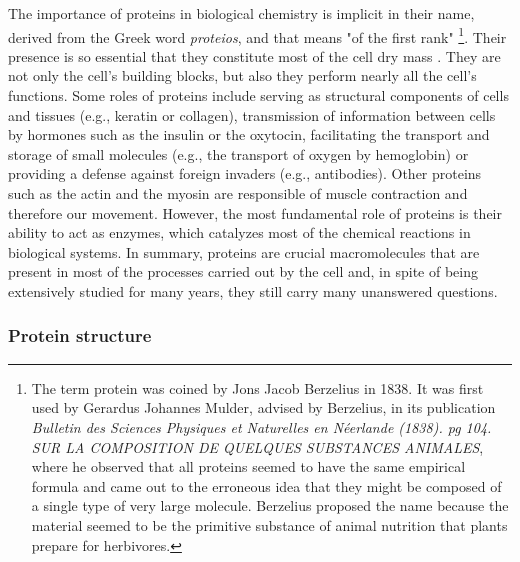 \documentclass[11pt, b5paper,twoside]{tesi_upf}
\begin{document}
\par The importance of proteins in biological chemistry is implicit in their name, derived from the Greek word \textit{proteios}, and that means "of the first rank" \footnote{The term protein was coined by Jons Jacob Berzelius in 1838. It was first used by Gerardus Johannes Mulder, advised by Berzelius, in its publication  \textit{Bulletin des Sciences Physiques et Naturelles en N\'eerlande (1838). pg 104. SUR LA COMPOSITION DE QUELQUES SUBSTANCES ANIMALES}, where he observed that all proteins seemed to have the same empirical formula and came out to the erroneous idea that they might be composed of a single type of very large molecule. Berzelius proposed the name because the material seemed to be the primitive substance of animal nutrition that plants prepare for herbivores.}. Their presence is so essential that they  constitute most of the cell dry mass \cite{kessel2010}. They are not only the cell's building blocks, but also they perform nearly all the cell's functions. Some roles of proteins include serving as structural components of cells and tissues (e.g., keratin or collagen), transmission of information between cells by hormones such as the insulin or the oxytocin, facilitating the transport and storage of small molecules (e.g., the transport of oxygen by hemoglobin) or providing a defense against foreign invaders (e.g., antibodies). Other proteins such as the actin and the myosin are responsible of muscle contraction and therefore our movement. However, the most fundamental role of proteins is their ability to act as enzymes, which catalyzes most of the chemical reactions in biological systems. In summary, proteins are crucial macromolecules that are present in most of the processes carried out by the cell and, in spite of being extensively studied for many years, they still carry many unanswered questions.    
  

\subsubsection{Protein structure}\label{protein_structure}
\end{document}
